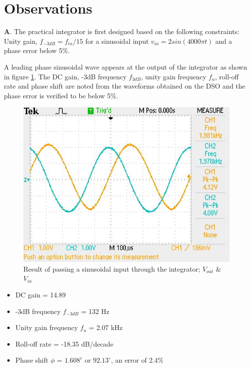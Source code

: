 \documentclass[12pt, titlepage]{article}
\theoremstyle{definition}
\begin{document}
  \newpage
  \section{Observations}
    \textbf{A}. The practical integrator is first designed based on the following constraints:
    Unity gain, $f_{-3dB} = f_{in}/15$ for a sinusoidal input
    $v_{in} = 2 sin(4000\pi t)$ and a phase error below 5\%.

    A leading phase sinusoidal wave appears at the output of the integrator as shown in figure \ref{fig:results_q1}.
    The DC gain, -3dB frequency $f_{3dB}$, unity gain frequency $f_u$, roll-off rate and phase shift are noted from the waveforms obtained on the DSO and the phase error is verified to be below 5\%.

    \begin{figure}
      \includegraphics[scale=0.25]{images/results_q1.jpeg}
      \caption{Result of passing a sinusoidal input through the integrator; \color{cyan}$V_{out}$ \color{black}\& \color{orange}$V_{in}$}
      \label{fig:results_q1}
    \end{figure}

    \begin{itemize}
      \item[] DC gain = 14.89
      \item[] -3dB frequency $f_{-3dB}$ = 132 Hz
      \item[] Unity gain frequency $f_u$ = 2.07 kHz
      \item[] Roll-off rate = -18.35 dB/decade
      \item[] Phase shift $\phi$ = $1.608^{c}$ or $92.13^{\circ}$, an error of 2.4\%
    \end{itemize}
\end{document}
